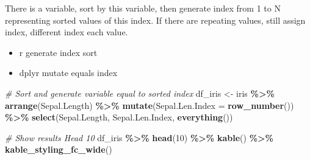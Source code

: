 \documentclass[
]{book}
\newenvironment{Shaded}{\begin{snugshade}}{\end{snugshade}}
\newcommand{\CommentTok}[1]{\textcolor[rgb]{0.56,0.35,0.01}{\textit{#1}}}
\newcommand{\DataTypeTok}[1]{\textcolor[rgb]{0.13,0.29,0.53}{#1}}
\newcommand{\DecValTok}[1]{\textcolor[rgb]{0.00,0.00,0.81}{#1}}
\newcommand{\KeywordTok}[1]{\textcolor[rgb]{0.13,0.29,0.53}{\textbf{#1}}}
\newcommand{\NormalTok}[1]{#1}
\newcommand{\OperatorTok}[1]{\textcolor[rgb]{0.81,0.36,0.00}{\textbf{#1}}}
\newcommand{\StringTok}[1]{\textcolor[rgb]{0.31,0.60,0.02}{#1}}
\providecommand{\tightlist}{%
  \setlength{\itemsep}{0pt}\setlength{\parskip}{0pt}}
\begin{document}
There is a variable, sort by this variable, then generate index from 1 to N representing sorted values of this index. If there are repeating values, still assign index, different index each value.

\begin{itemize}
\tightlist
\item
  r generate index sort
\item
  dplyr mutate equals index
\end{itemize}

\begin{Shaded}
\begin{Highlighting}[]
\CommentTok{\# Sort and generate variable equal to sorted index}
\NormalTok{df\_iris \textless{}{-}}\StringTok{ }\NormalTok{iris }\OperatorTok{\%\textgreater{}\%}\StringTok{ }\KeywordTok{arrange}\NormalTok{(Sepal.Length) }\OperatorTok{\%\textgreater{}\%}
\StringTok{              }\KeywordTok{mutate}\NormalTok{(}\DataTypeTok{Sepal.Len.Index =} \KeywordTok{row\_number}\NormalTok{()) }\OperatorTok{\%\textgreater{}\%}
\StringTok{              }\KeywordTok{select}\NormalTok{(Sepal.Length, Sepal.Len.Index, }\KeywordTok{everything}\NormalTok{())}

\CommentTok{\# Show results Head 10}
\NormalTok{df\_iris }\OperatorTok{\%\textgreater{}\%}\StringTok{ }\KeywordTok{head}\NormalTok{(}\DecValTok{10}\NormalTok{) }\OperatorTok{\%\textgreater{}\%}
\StringTok{  }\KeywordTok{kable}\NormalTok{() }\OperatorTok{\%\textgreater{}\%}
\StringTok{  }\KeywordTok{kable\_styling\_fc\_wide}\NormalTok{()}
\end{Highlighting}
\end{Shaded}

\begin{table}[!h]
\centering
{}
\end{table}
\end{document}
